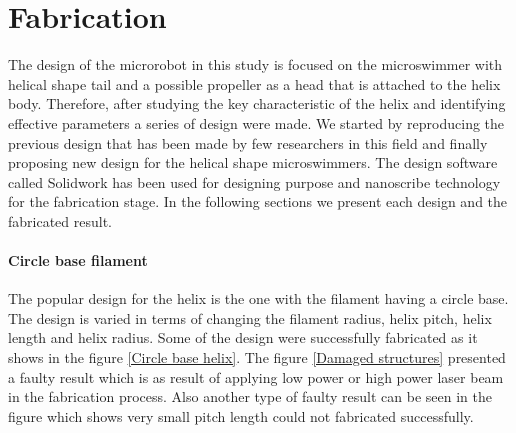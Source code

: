\documentclass[12pt,a4paper,titlepage]{report}
\begin{document}
\section{Fabrication}

The design of the microrobot in this study is focused on the microswimmer with helical shape tail 
and a possible propeller as a head that is attached to the helix body. Therefore, after studying the 
key characteristic of the helix and identifying effective parameters a series of design were made. We started 
by reproducing the previous design that has been made by few researchers in this field and finally proposing 
new design for the helical shape microswimmers. The design software called Solidwork has been used for 
designing purpose and nanoscribe technology for the fabrication stage. In the following sections we present 
each design and the fabricated result.

\paragraph{Circle base filament}
The popular design for the helix is the one with the filament having a circle base. The design is varied in terms of 
changing the filament radius, helix pitch, helix length and helix radius. Some of the design were successfully fabricated
as it shows in the figure \ref{Circle base helix}. The figure \ref{Damaged structures} presented a faulty result which is as result of applying low power or 
high power laser beam in the fabrication process. Also another type of faulty result can be seen in the figure
which shows very small pitch length could not fabricated successfully.
\end{document}
